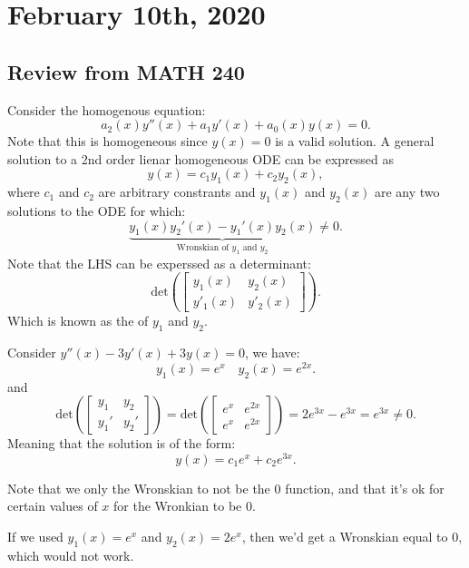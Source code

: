 \documentclass[../main/main.tex]{subfiles}
\begin{document}
\section{February 10th, 2020}
\subsection{Review from MATH 240}
Consider the homogenous equation: \[
	a_2(x)y''(x) + a_1y'(x)+a_0(x)y(x)=0
.\] Note that this is homogeneous since $y(x) = 0$ is a valid solution. A general solution to a 2nd order lienar homogeneous ODE can be expressed as \[
y(x) = c_1y_1(x) + c_2y_2(x)
,\]  where $c_1$ and $c_2$ are arbitrary constrants and $y_1(x)$ and $y_2(x)$ are any two solutions to the ODE for which: \[
\underbrace{y_1(x) y_2'(x)-y_1'(x)y_2(x)}_{\text{Wronskian of $y_1$ and $y_2$}}\neq 0
.\] Note that the LHS can be experssed as a determinant: \[
\text{det}\left(\begin{bmatrix} y_1(x)&y_2(x)\\y'_1(x)&y'_2(x) \end{bmatrix} \right)
.\] Which is known as the  of $y_1$ and $y_2$.
\begin{example} \label{coneq}
	Consider $y''(x)-3y'(x)+3y(x)=0$, we have:  \[
		y_1(x)=e^{x}\quad y_2(x) = e^{2x}
	.\] and \[
	\text{det}\left( \begin{bmatrix} y_1&y_2\\y_1'&y_2' \end{bmatrix}  \right) = \text{det}\left( \begin{bmatrix} e^{x}&e^{2x}\\e^{x}&e^{2x} \end{bmatrix}  \right) = 2e^{3x}-e^{3x}=e^{3x}\neq 0
	.\] Meaning that the solution is of the form: \[
	y(x) = c_1e^{x}+c_2e^{3x}
	.\] 
\end{example}
\begin{remark}
	Note that we only the Wronskian to not be the 0 function, and that it's ok for certain values of $x$ for the Wronkian to be 0.
\end{remark}
\begin{example}
	If we used $y_1(x)=e^{x}$ and $y_2(x)=2e^{x}$, then we'd get a Wronskian equal to 0, which would not work.
\end{example}
\end{document}
